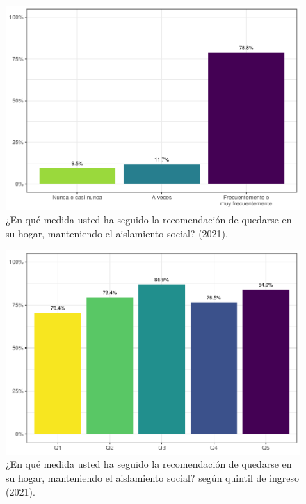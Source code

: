 \documentclass[
  12pt,
  openany]{book}
\begin{document}
\begin{figure}

{\centering \includegraphics{reporte-elsoc_files/figure-latex/dist-total-1} 

}

\caption{¿En qué medida usted ha seguido la recomendación de quedarse en su hogar, manteniendo el aislamiento social? (2021).}\label{fig:dist-total}
\end{figure}

\begin{figure}

{\centering \includegraphics{reporte-elsoc_files/figure-latex/dist-quintil-1} 

}

\caption{¿En qué medida usted ha seguido la recomendación de quedarse en su hogar, manteniendo el aislamiento social? según quintil de ingreso (2021).}\label{fig:dist-quintil}
\end{figure}
\end{document}
